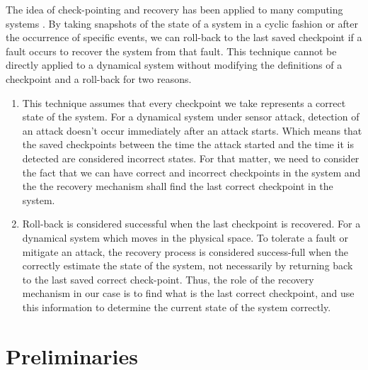 \documentclass[conference]{IEEEtran}
\begin{document}
The idea of check-pointing and recovery has been applied to many computing systems \cite{Zhang2003,Processors2017,Koo1987, Prakash1996}. By taking snapshots of the state of a system in a cyclic fashion or after the occurrence of specific events, we can roll-back to the last saved checkpoint if a fault occurs to recover the system from that fault. This technique cannot be directly applied to a dynamical system without modifying the definitions of a checkpoint and a roll-back for two reasons. 
\begin{enumerate}
    \item This technique assumes that every checkpoint we take represents a correct state of the system. For a dynamical system under sensor attack, detection of an attack doesn't occur immediately after an attack starts. Which means that the saved checkpoints between the time the attack started and the time it is detected are considered incorrect states. For that matter, we need to consider the fact that we can have correct and incorrect checkpoints in the system and the the recovery mechanism shall find the last correct checkpoint in the system.
    \item Roll-back is considered successful when the last checkpoint is recovered. For a dynamical system which moves in the physical space. To tolerate a fault or mitigate an attack, the recovery process is considered success-full when the correctly estimate the state of the system, not necessarily by returning back to the last saved correct check-point. Thus, the role of the recovery mechanism in our case is to find what is the last correct checkpoint, and use this information to determine the current state of the system correctly.
\end{enumerate}

\section{Preliminaries}\label{sec:Preliminaries}
\end{document}

